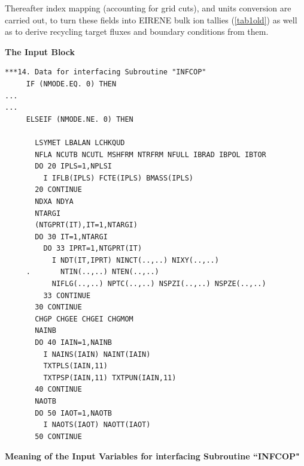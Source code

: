 Thereafter index mapping (accounting for grid cuts), and units conversion are
carried out,  to turn these fields into EIRENE bulk ion tallies
(\cref{tab1old}) as well as to derive recycling target fluxes and boundary
conditions from them.

\textbf{The Input Block} 

\begin{lstlisting}
***14. Data for interfacing Subroutine "INFCOP"
     IF (NMODE.EQ. 0) THEN
...
...
     ELSEIF (NMODE.NE. 0) THEN

       LSYMET LBALAN LCHKQUD
       NFLA NCUTB NCUTL MSHFRM NTRFRM NFULL IBRAD IBPOL IBTOR
       DO 20 IPLS=1,NPLSI
         I IFLB(IPLS) FCTE(IPLS) BMASS(IPLS)
       20 CONTINUE
       NDXA NDYA
       NTARGI
       (NTGPRT(IT),IT=1,NTARGI)
       DO 30 IT=1,NTARGI
         DO 33 IPRT=1,NTGPRT(IT)
           I NDT(IT,IPRT) NINCT(..,..) NIXY(..,..) 
     .       NTIN(..,..) NTEN(..,..)
           NIFLG(..,..) NPTC(..,..) NSPZI(..,..) NSPZE(..,..)
         33 CONTINUE
       30 CONTINUE
       CHGP CHGEE CHGEI CHGMOM
       NAINB
       DO 40 IAIN=1,NAINB
         I NAINS(IAIN) NAINT(IAIN)
         TXTPLS(IAIN,11)
         TXTPSP(IAIN,11) TXTPUN(IAIN,11)
       40 CONTINUE
       NAOTB
       DO 50 IAOT=1,NAOTB
         I NAOTS(IAOT) NAOTT(IAOT)
       50 CONTINUE
\end{lstlisting} 

\textbf{Meaning of the Input Variables for interfacing Subroutine ``INFCOP"}

\medskip 

